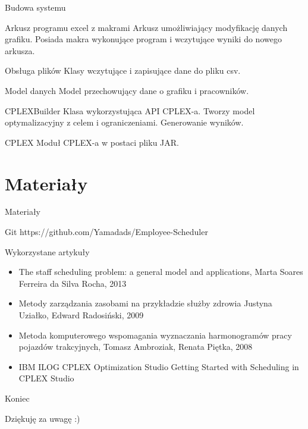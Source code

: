 \documentclass{beamer}
\begin{document}
\begin{frame}{Budowa systemu}
\begin{block}{Arkusz programu excel z makrami}
Arkusz umożliwiający modyfikację danych grafiku. Posiada makra wykonujące program i wczytujące wyniki do nowego arkusza.
\end{block}
\begin{block}{Obsługa plików}
Klasy wczytujące i zapisujące dane do pliku csv.  
\end{block}
\begin{block}{Model danych}
Model przechowujący dane o grafiku i pracowników. 
\end{block}
\begin{block}{CPLEXBuilder}
Klasa wykorzystująca API CPLEX-a. Tworzy model optymalizacyjny z celem i ograniczeniami. Generowanie wyników.
\end{block}
\begin{block}{CPLEX}
Moduł CPLEX-a w postaci pliku JAR.
\end{block}
\end{frame}

\section{Materiały}

\begin{frame}{Materiały}
\begin{block}{Git}
https://github.com/Yamadads/Employee-Scheduler
\end{block}
\begin{block}{Wykorzystane artykuły}
\begin{itemize}
    \item {The staff scheduling problem: a general
model and applications,
Marta Soares Ferreira da Silva Rocha, 2013}
    \item{Metody zarządzania zasobami na przykładzie służby zdrowia
Justyna Uziałko,
Edward Radosiński, 2009}
    \item{Metoda komputerowego wspomagania wyznaczania harmonogramów pracy pojazdów trakcyjnych,
Tomasz Ambroziak, Renata Piętka, 2008}
    \item{IBM ILOG CPLEX Optimization Studio
Getting Started with Scheduling in CPLEX Studio}
\end{itemize}

\end{block}

\end{frame}

\begin{frame}{Koniec}
\begin{center}
Dziękuję za uwagę :)
\end{center}
\end{frame}
\end{document}
